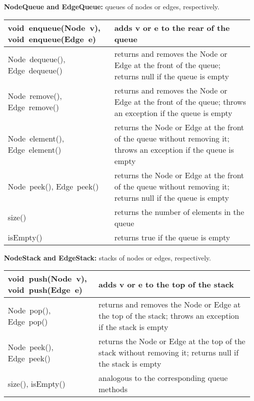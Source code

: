 \begin{table}
  \small
  \centering
  
  \textbf{NodeQueue and EdgeQueue:} queues of nodes or edges, respectively.

  \medskip
  \begin{tabular}{| m{} | m{} |}
    \hline
    \shortstack[l]{
      \textsf{void~enqueue(Node~v)},\\
      \textsf{void~enqueue(Edge~e)}
    }
    &
    adds \textsf{v} or \textsf{e} to the rear of the queue
    \\ \hline
    \textsf{Node~dequeue()}, \textsf{Edge~dequeue()}
    &
    returns and removes the \textsf{Node} or \textsf{Edge} at the front of the queue;
    returns \textsf{null} if the queue is empty
    \\ \hline
    \textsf{Node~remove()}, \textsf{Edge~remove()}
    &
    returns and removes the \textsf{Node} or \textsf{Edge} at the front of the queue;
    throws an exception if the queue is empty
    \\ \hline
    \textsf{Node~element()}, \textsf{Edge~element()}
    &
    returns the \textsf{Node} or \textsf{Edge} at the front of the queue
    without removing it;
    throws an exception if the queue is empty
    \\ \hline
    \textsf{Node~peek()}, \textsf{Edge~peek()}
    &
    returns the \textsf{Node} or \textsf{Edge} at the front of the queue
    without removing it;
    returns \textsf{null} if the queue is empty
    \\ \hline
    \textsf{size()}
    &
    returns the number of elements in the queue
    \\ \hline
    \textsf{isEmpty()}
    &
    returns \textsf{true} if the queue is empty 
    \\ \hline
  \end{tabular}

  \bigskip
  \textbf{NodeStack and EdgeStack:} stacks of nodes or edges, respectively.

  \medskip
  \begin{tabular}{| m{} | m{} |}
    \hline
    \shortstack[l]{
      \textsf{void~push(Node~v)},\\
      \textsf{void~push(Edge~e)}
    }
    &
    adds \textsf{v} or \textsf{e} to the top of the stack
    \\ \hline
    \textsf{Node~pop()}, \textsf{Edge~pop()}
    &
    returns and removes the \textsf{Node} or \textsf{Edge} at the top of the stack;
    throws an exception if the stack is empty
    \\ \hline
    \textsf{Node~peek()}, \textsf{Edge~peek()}
    &
    returns the \textsf{Node} or \textsf{Edge} at the top of the stack
    without removing it;
    returns null if the stack is empty
    \\ \hline
    \textsf{size()}, \textsf{isEmpty()}
    &
    analogous to the corresponding queue methods
    \\ \hline
  \end{tabular}


\end{table}
